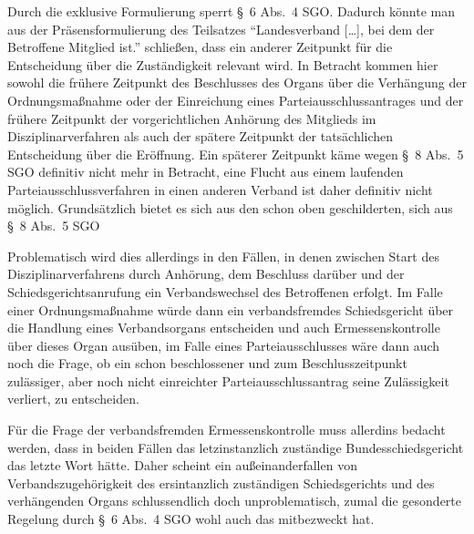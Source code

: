 Durch die exklusive Formulierung sperrt \S~6 Abs.~4 SGO.
Dadurch könnte man aus der Präsensformulierung des Teilsatzes \enquote{Landesverband […], bei dem der Betroffene Mitglied ist.} schließen, dass ein anderer Zeitpunkt für die Entscheidung über die Zuständigkeit relevant wird.
In Betracht kommen hier sowohl die frühere Zeitpunkt des Beschlusses des Organs über die Verhängung der Ordnungsmaßnahme oder der Einreichung eines Parteiausschlussantrages und der frühere Zeitpunkt der vorgerichtlichen Anhörung des Mitglieds im Disziplinarverfahren als auch der spätere Zeitpunkt der tatsächlichen Entscheidung über die Eröffnung.
Ein späterer Zeitpunkt käme wegen \S~8 Abs.~5 SGO definitiv nicht mehr in Betracht, eine Flucht aus einem laufenden Parteiausschlussverfahren in einen anderen Verband ist daher definitiv nicht möglich.
Grundsätzlich bietet es sich aus den schon oben geschilderten, sich aus \S~8 Abs.~5 SGO

Problematisch wird dies allerdings in den Fällen, in denen zwischen Start des Disziplinarverfahrens durch Anhörung, dem Beschluss darüber und der Schiedsgerichtsanrufung ein Verbandswechsel des Betroffenen erfolgt.
Im Falle einer Ordnungsmaßnahme würde dann ein verbandsfremdes Schiedsgericht über die Handlung eines Verbandsorgans entscheiden und auch Ermessenskontrolle über dieses Organ ausüben, im Falle eines Parteiausschlusses wäre dann auch noch die Frage, ob ein schon beschlossener und zum Beschlusszeitpunkt zulässiger, aber noch nicht einreichter Parteiausschlussantrag seine Zulässigkeit verliert, zu entscheiden.

Für die Frage der verbandsfremden Ermessenskontrolle muss allerdins bedacht werden, dass in beiden Fällen das letzinstanzlich zuständige Bundesschiedsgericht das letzte Wort hätte.
Daher scheint ein außeinanderfallen von Verbandszugehörigkeit des ersintanzlich zuständigen Schiedsgerichts und des verhängenden Organs schlussendlich doch unproblematisch, zumal die gesonderte Regelung durch \S~6 Abs.~4 SGO wohl auch das mitbezweckt hat.

